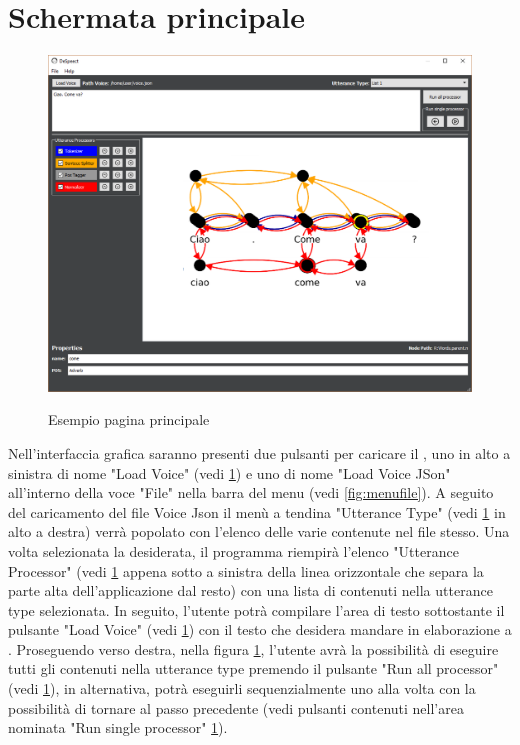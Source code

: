 \documentclass[../AnalisideiRequisiti.tex]{subfiles}
\begin{document}
	\section{Schermata principale}
		\begin{figure}[htp]
			\caption{Esempio pagina principale}
			\centering
			\includegraphics[width=\textwidth]{../img/paginainiziale.png}
			\label{fig:GUI}
		\end{figure}	
		Nell'interfaccia grafica saranno presenti due pulsanti per caricare il , uno in alto a sinistra di nome "Load Voice" (vedi \ref{fig:GUI}) e uno di nome "Load Voice JSon" all'interno della voce "File" nella barra del menu (vedi \ref{fig:menufile}).
		 A seguito del caricamento del file Voice Json il menù a tendina "Utterance Type" (vedi \ref{fig:GUI} in alto a destra) verrà popolato con l'elenco delle varie  contenute nel file stesso. 
		 Una volta selezionata la  desiderata, il programma riempirà l'elenco "Utterance Processor" (vedi \ref{fig:GUI} appena sotto a sinistra della linea orizzontale che separa la parte alta dell'applicazione dal resto) con una lista di  contenuti nella utterance type selezionata. 
		 In seguito, l'utente potrà compilare l'area di testo sottostante il pulsante "Load Voice" (vedi \ref{fig:GUI}) con il testo che desidera mandare in elaborazione a .
		 Proseguendo verso destra, nella figura \ref{fig:GUI}, l'utente avrà la possibilità di eseguire tutti gli  contenuti nella utterance type premendo il pulsante "Run all processor" (vedi \ref{fig:GUI}), in alternativa, potrà eseguirli sequenzialmente uno alla volta con la possibilità di tornare al passo precedente (vedi pulsanti contenuti nell'area nominata "Run single processor" \ref{fig:GUI}). 
\end{document}
